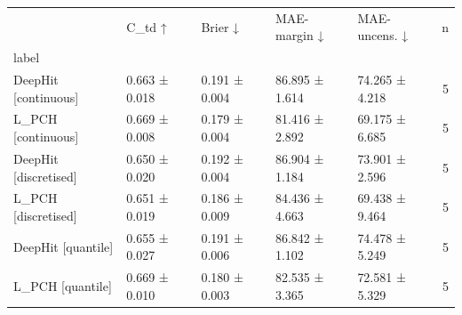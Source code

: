 \begin{tabular}{lllllr}
\toprule
 & C\_td ↑ & Brier ↓ & MAE-margin ↓ & MAE-uncens. ↓ & n \\
label &  &  &  &  &  \\
\midrule
DeepHit [continuous] & 0.663 ± 0.018 & 0.191 ± 0.004 & 86.895 ± 1.614 & 74.265 ± 4.218 & 5 \\
L\_PCH [continuous] & 0.669 ± 0.008 & 0.179 ± 0.004 & 81.416 ± 2.892 & 69.175 ± 6.685 & 5 \\
DeepHit [discretised] & 0.650 ± 0.020 & 0.192 ± 0.004 & 86.904 ± 1.184 & 73.901 ± 2.596 & 5 \\
L\_PCH [discretised] & 0.651 ± 0.019 & 0.186 ± 0.009 & 84.436 ± 4.663 & 69.438 ± 9.464 & 5 \\
DeepHit [quantile] & 0.655 ± 0.027 & 0.191 ± 0.006 & 86.842 ± 1.102 & 74.478 ± 5.249 & 5 \\
L\_PCH [quantile] & 0.669 ± 0.010 & 0.180 ± 0.003 & 82.535 ± 3.365 & 72.581 ± 5.329 & 5 \\
\bottomrule
\end{tabular}

